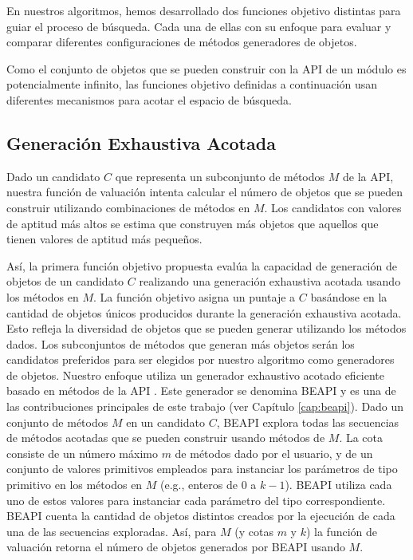 En nuestros algoritmos, hemos desarrollado dos funciones objetivo distintas para guiar el proceso de búsqueda. 
Cada una de ellas con su enfoque para evaluar y comparar diferentes configuraciones de métodos generadores de objetos.

Como el conjunto de objetos que se pueden construir con la API de un módulo es potencialmente infinito, las funciones objetivo definidas a continuación usan diferentes mecanismos para acotar el espacio de búsqueda.


\subsection{Generación Exhaustiva Acotada}
\label{sec:fitnessGE}

Dado un candidato $C$ que representa un subconjunto de métodos $M$ de la API, 
nuestra función de valuación intenta calcular el número de objetos que se pueden construir utilizando combinaciones de métodos en $M$. 
Los candidatos con valores de aptitud más altos se estima que construyen más objetos que aquellos que tienen valores de aptitud más pequeños.

Así, la primera función objetivo propuesta evalúa la capacidad de generación de objetos de un candidato $C$ realizando una generación exhaustiva acotada \cite{Politano20} usando los métodos en $M$. La función objetivo asigna un puntaje a $C$ basándose en la cantidad de objetos únicos producidos durante la generación exhaustiva acotada. Esto refleja la diversidad de objetos que se pueden generar utilizando los métodos dados. Los subconjuntos de métodos que generan más objetos serán los candidatos preferidos para ser elegidos por nuestro algoritmo como generadores de objetos.
Nuestro enfoque utiliza un generador exhaustivo acotado eficiente basado en métodos de la API \cite{Politano20}. Este generador se denomina BEAPI y es una de las contribuciones principales de este trabajo (ver Capítulo \ref{cap:beapi}).
Dado un conjunto de métodos $M$ en un candidato $C$, BEAPI explora todas las secuencias de métodos acotadas que se pueden construir usando métodos de $M$. La cota consiste de un número máximo $m$ de métodos dado por el usuario, y de un conjunto de valores primitivos empleados para instanciar los parámetros de tipo primitivo en los métodos en $M$ (e.g., enteros de \( 0 \) a \( k-1 \)).
BEAPI utiliza cada uno de estos valores para instanciar cada parámetro del tipo correspondiente. 
BEAPI cuenta la cantidad de objetos distintos creados por la ejecución de cada una de las secuencias exploradas. 
Así, para $M$ (y cotas $m$ y $k$) la función de valuación retorna el número de objetos generados por BEAPI usando $M$.

